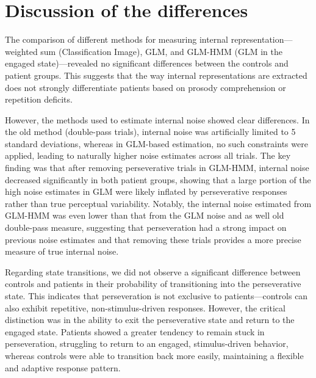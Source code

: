 \section{Discussion of the differences} 
The comparison of different methods for measuring internal representation—weighted sum (Classification Image), GLM, and GLM-HMM (GLM in the engaged state)—revealed no significant differences between the controls and patient groups. This suggests that the way internal representations are extracted does not strongly differentiate patients based on prosody comprehension or repetition deficits.

However, the methods used to estimate internal noise showed clear differences. In the old method (double-pass trials), internal noise was artificially limited to 5 standard deviations, whereas in GLM-based estimation, no such constraints were applied, leading to naturally higher noise estimates across all trials. The key finding was that after removing perseverative trials in GLM-HMM, internal noise decreased significantly in both patient groups, showing that a large portion of the high noise estimates in GLM were likely inflated by perseverative responses rather than true perceptual variability. Notably, the internal noise estimated from GLM-HMM was even lower than that from the GLM noise and as well old double-pass measure, suggesting that perseveration had a strong impact on previous noise estimates and that removing these trials provides a more precise measure of true internal noise.

Regarding state transitions, we did not observe a significant difference between controls and patients in their probability of transitioning into the perseverative state. This indicates that perseveration is not exclusive to patients—controls can also exhibit repetitive, non-stimulus-driven responses. However, the critical distinction was in the ability to exit the perseverative state and return to the engaged state. Patients showed a greater tendency to remain stuck in perseveration, struggling to return to an engaged, stimulus-driven behavior, whereas controls were able to transition back more easily, maintaining a flexible and adaptive response pattern.

